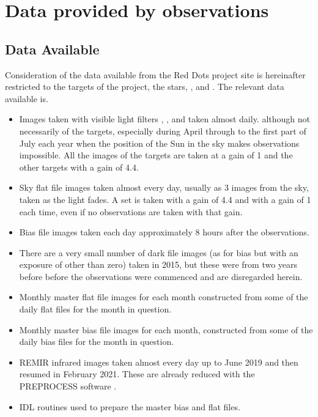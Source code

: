\section{Data provided by {\rem} observations}
\protect\label{section:tdataprovided}

\subsection{Data Available}

Consideration of the data available from the Red Dots project site is
hereinafter restricted to the targets of the project, the {\rdwarf} stars,
\prox, {\bstar} and \ross. The relevant data available is.

\begin{itemize}
\item Images taken with visible light filters , ,
 and  taken almost daily. although not necessarily of the {\rem} {\rdwarf} targets,
especially during April through to the first part of July each year when the position of the Sun in the sky makes
observations impossible. All the images of the {\rem} {\rdwarf} targets are taken
at a gain of 1 and the other targets with a gain of 4.4. 
\item Sky flat file images taken almost every day, usually as 3 images from the
sky, taken as the light fades. A set is taken with a gain of 4.4 and with a gain
of 1 each time, even if no observations are taken with that gain.
\item Bias file images taken each day
approximately 8 hours after the observations.
\item There are a very small number of dark file images (as for bias but with
an exposure of other than zero) taken in 2015, but these were from two years
before before the {\rdwarf} observations were commenced and are disregarded
herein.
\item Monthly master flat file images for each month constructed from some of
the daily flat files for the month in question.
\item Monthly master bias file images for each month, constructed from some of
the daily bias files for the month in question.
\item REMIR infrared images taken almost every day up to June 2019 and then
resumed in February 2021.
These are already reduced with the PREPROCESS software \citep{dipaola01}.
\item IDL routines used to prepare the master bias and flat files.
\end{itemize}

